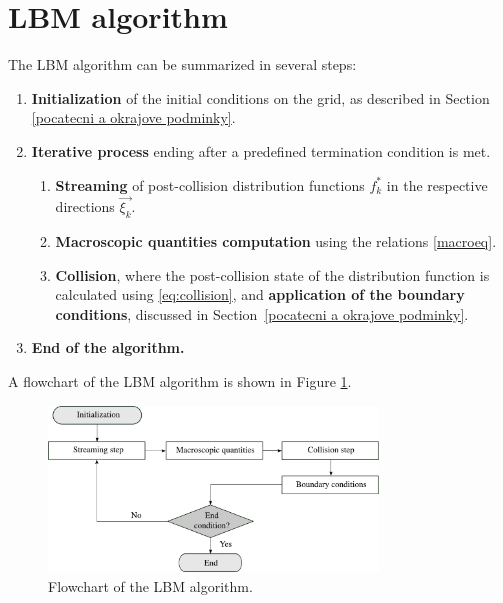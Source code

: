 \section{LBM algorithm}\label{algoritmus LBM}
The LBM algorithm can be summarized in several steps:
\begin{enumerate}
	\item \textbf{Initialization} of the initial conditions on the grid, as described in Section \ref{pocatecni a okrajove podminky}.
	\item \textbf{Iterative process} ending after a predefined termination condition is met.
	\begin{enumerate}
		\item \textbf{Streaming} of post-collision distribution functions \( f^{*}_{k} \) in the respective directions \( \vec{\xi_{k}} \).
		\item \textbf{Macroscopic quantities computation} using the relations \eqref{macroeq}.
		\item \textbf{Collision}, where the post-collision state of the distribution function is calculated using \eqref{eq:collision}, and \textbf{application of the boundary conditions}, discussed in Section~\ref{pocatecni a okrajove podminky}.
	\end{enumerate}
	\item \textbf{End of the algorithm.}
\end{enumerate}
A flowchart of the LBM algorithm is shown in Figure \ref{fig:algo}.
\begin{figure}[h]
	\centering
	\includegraphics[width=0.78\textwidth]{figures/algo-bw.pdf}
	\caption{Flowchart of the LBM algorithm.}
	\label{fig:algo}
\end{figure}